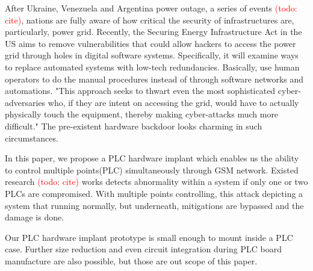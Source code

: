 After Ukraine, Venezuela and Argentina power outage, a series of events \textcolor{red}{(todo: cite)}, nations are fully aware of how critical the security of infrastructures are, particularly, power grid. Recently, the Securing Energy Infrastructure Act in the US aims to remove vulnerabilities that could allow hackers to access the power grid through holes in digital software systems. Specifically, it will examine ways to replace automated systems with low-tech redundancies. Basically, use human operators to do the manual procedures instead of through software networks and automations. "This approach seeks to thwart even the most sophisticated cyber-adversaries who, if they are intent on accessing the grid, would have to actually physically touch the equipment, thereby making cyber-attacks much more difficult." The pre-existent hardware backdoor looks charming in such circumstances.

In this paper, we propose a PLC hardware implant which enables us the ability to control multiple points(PLC) simultaneously through GSM network. Existed research \textcolor{red}{(todo: cite)} works detects abnormality within a system if only one or two PLCs are compromised. With multiple points controlling, this attack depicting a system that running normally, but underneath, mitigations are bypassed and the damage is done.

Our PLC hardware implant prototype is small enough to mount inside a PLC case. Further size reduction and even circuit integration during PLC board manufacture are also possible, but those are out scope of this paper.
